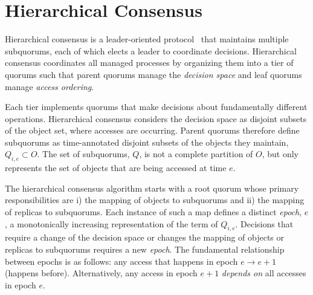 \documentclass[sigconf]{acmart}
\begin{document}
\section{Hierarchical Consensus}


Hierarchical consensus is a leader-oriented protocol~\cite{ongaro_search_2014} that
maintains multiple subquorums, each of which elects a leader to
coordinate decisions.
Hierarchical consensus coordinates all managed processes by organizing them into a tier
of quorums such that parent quorums manage the \emph{decision space} and leaf quorums
manage \emph{access ordering}.

Each tier implements quorums that make decisions about fundamentally different operations.
Hierarchical consensus considers the decision space as disjoint subsets of the object
set, where accesses are occurring.
Parent quorums therefore define subquorums as time-annotated disjoint subsets of the
objects they maintain, $Q_{i,e} \subset O$.
The set of subquorums, $Q$, is not a complete partition of $O$, but only represents the
set of objects that are being accessed at time $e$.


The hierarchical consensus algorithm starts with a root quorum whose primary
responsibilities are i) the mapping of objects to subquorums and ii) the
mapping of replicas to subquorums.
Each instance of such a map defines a distinct \emph{epoch}, $e$, a
monotonically increasing representation of the term of $Q_{i,e}$.
Decisions that require a change of the decision space or changes the
mapping of objects or replicas to subquorums requires a new \emph{epoch}.
The fundamental relationship between epochs is as follows: any access that
happens in epoch $e \rightarrow e+1$ (happens before).
Alternatively, any access in epoch $e+1$ \emph{depends on} all accesses in
epoch $e$.
\end{document}
